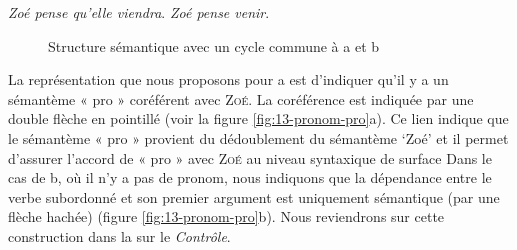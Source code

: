 \ea\label{ex:13-pronom}
\ea \textit{Zoé pense qu’elle viendra}.
\ex \textit{Zoé pense venir}.\z\z

\begin{figure}
\caption{Structure sémantique avec un cycle commune à a et b \label{fig:13-pronom-sem}}
\end{figure}

La représentation que nous proposons pour a est d’indiquer qu’il y a un sémantème « pro » coréférent avec \textsc{Zoé}. La coréférence est indiquée par une double flèche en pointillé (voir la figure \ref{fig:13-pronom-pro}a). Ce lien indique que le sémantème « pro » provient du dédoublement du sémantème ‘Zoé’ et il permet d’assurer l’accord de « pro » avec \textsc{Zoé} au niveau syntaxique de surface Dans le cas de b, où il n’y a pas de pronom, nous indiquons que la dépendance entre le verbe subordonné et son premier argument est uniquement sémantique (par une flèche hachée) (figure \ref{fig:13-pronom-pro}b). Nous reviendrons sur cette construction dans la  sur le \textit{Contrôle}.

